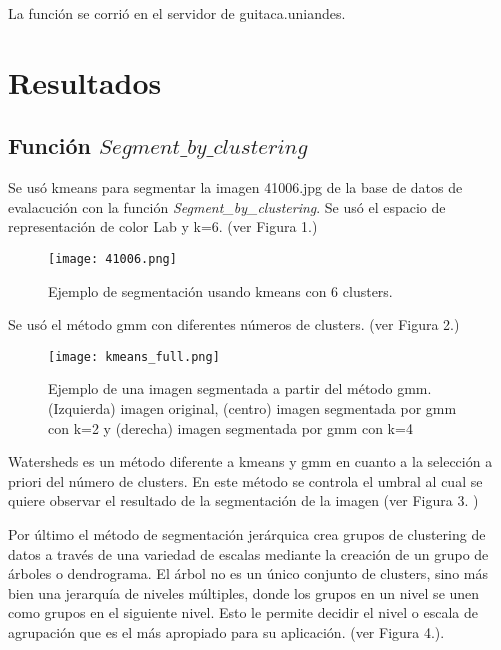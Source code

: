 \documentclass[10pt,twocolumn,letterpaper]{article}
\begin{document}
La función se corrió en el servidor de guitaca.uniandes.

\section{Resultados}
\subsection{Función $Segment\_by\_clustering$}

Se usó kmeans para segmentar la imagen 41006.jpg de la base de datos de evalacución con la función \textit{Segment\_by\_clustering}. Se usó el espacio de representación de color Lab y k=6. (ver Figura 1.)

\begin{figure}[h]
\begin{center}
   \texttt{[image: 41006.png]}
\end{center}
   \caption{Ejemplo de segmentación usando kmeans con 6 clusters.}
\label{fig:long}
\label{fig:onecol}
\end{figure}

Se usó el método gmm con diferentes números de clusters. (ver Figura 2.)

\begin{figure*}
\begin{center}
\texttt{[image: kmeans\_full.png]}
\end{center}
   \caption{Ejemplo de una imagen segmentada a partir del método gmm. (Izquierda) imagen original, (centro) imagen segmentada por gmm con k=2 y (derecha) imagen segmentada por gmm con k=4}
\label{fig:short}
\end{figure*}

Watersheds es un método diferente a kmeans y gmm en cuanto a la selección a priori del número de clusters. En este método se controla el umbral al cual se quiere observar el resultado de la segmentación de la imagen (ver Figura 3. )\

Por último el método de segmentación jerárquica crea grupos de clustering de datos a través de una variedad de escalas mediante la creación de un grupo de árboles o dendrograma. El árbol no es un único conjunto de clusters, sino más bien una jerarquía de niveles múltiples, donde los grupos en un nivel se unen como grupos en el siguiente nivel. Esto le permite decidir el nivel o escala de agrupación que es el más apropiado para su aplicación. (ver Figura 4.).
\end{document}
